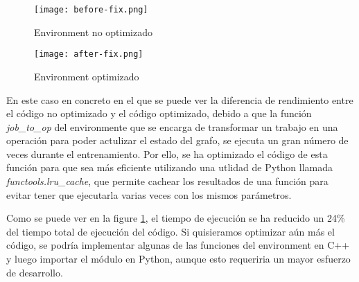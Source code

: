 \begin{figure}
    \centering
    \begin{minipage}{0.47\textwidth}
        \centering
        \texttt{[image: before-fix.png]} 
        \caption{Environment no optimizado}
    \end{minipage}\hfill
    \begin{minipage}{0.47\textwidth}
        \centering
        \texttt{[image: after-fix.png]}
        \caption{Environment optimizado}
        \label{fig:after-fix}
    \end{minipage}
\end{figure}

En este caso en concreto en el que se puede ver la diferencia de rendimiento
entre el código no optimizado y el código optimizado, debido a que la función
\textit{job\_to\_op} del environmente que se encarga de transformar un trabajo
en una operación para poder actulizar el estado del grafo, se ejecuta un gran
número de veces durante el entrenamiento. Por ello, se ha optimizado el código
de esta función para que sea más eficiente utilizando una utlidad de Python
llamada \textit{functools.lru\_cache}, que permite cachear los resultados de
una función para evitar tener que ejecutarla varias veces con los mismos
parámetros.\medskip

Como se puede ver en la figure \ref{fig:after-fix}, el tiempo de ejecución
se ha reducido un 24\% del tiempo total de ejecución del código. Si quisieramos
optimizar aún más el código, se podría implementar algunas de las funciones
del environment en C++ y luego importar el módulo en Python, aunque esto
requeriria un mayor esfuerzo de desarrollo. 